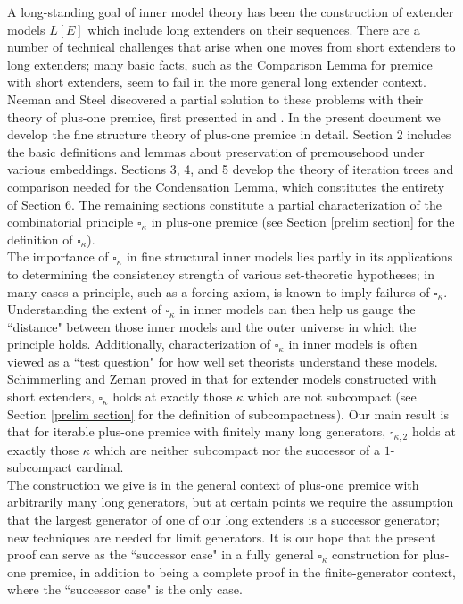 \documentclass[12pt]{article}
\begin{document}
A long-standing goal of inner model theory has been the construction of extender models $L[E]$ which include long extenders on their sequences.  There are a number of technical challenges that arise when one moves from short extenders to long extenders; many basic facts, such as the Comparison Lemma for premice with short extenders, seem to fail in the more general long extender context.  Neeman and Steel discovered a partial solution to these problems with their theory of plus-one premice, first presented in \cite{PIPM} and \cite{FSPIPM}.  In the present document we develop the fine structure theory of plus-one premice in detail.  Section 2 includes the basic definitions and lemmas about preservation of premousehood under various embeddings.  Sections 3, 4, and 5 develop the theory of iteration trees and comparison needed for the Condensation Lemma, which constitutes the entirety of Section 6.  The remaining sections constitute a partial characterization of the combinatorial principle $\square_\kappa$ in plus-one premice (see Section \ref{prelim section} for the definition of $\square_\kappa$).\\

The importance of $\square_\kappa$ in fine structural inner models lies partly in its applications to determining the consistency strength of various set-theoretic hypotheses; in many cases a principle, such as a forcing axiom, is known to imply failures of $\square_\kappa$.  Understanding the extent of $\square_\kappa$ in inner models can then help us gauge the ``distance" between those inner models and the outer universe in which the principle holds.  Additionally, characterization of $\square_\kappa$ in inner models is often viewed as a ``test question" for how well set theorists understand these models.\\

Schimmerling and Zeman proved in \cite{zeman square proof} that for extender models constructed with short extenders, $\square_\kappa$ holds at exactly those $\kappa$ which are not subcompact (see Section \ref{prelim section} for the definition of subcompactness).  Our main result is that for iterable plus-one premice with finitely many long generators, $\square_{\kappa, 2}$ holds at exactly those $\kappa$ which are neither subcompact nor the successor of a $1$-subcompact cardinal.\\

The construction we give is in the general context of plus-one premice with arbitrarily many long generators, but at certain points we require the assumption that the largest generator of one of our long extenders is a successor generator; new techniques are needed for limit generators.  It is our hope that the present proof can serve as the ``successor case" in a fully general $\square_\kappa$ construction for plus-one premice, in addition to being a complete proof in the finite-generator context, where the ``successor case" is the only case.\\
\end{document}
